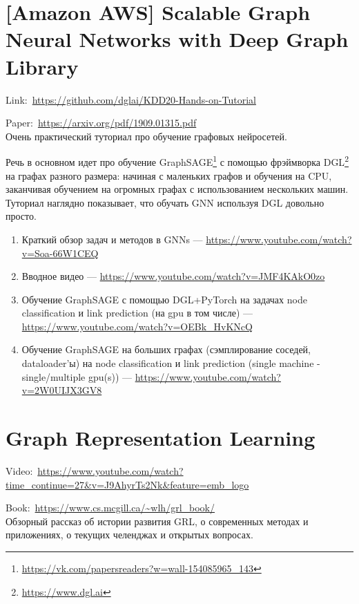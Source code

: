\section*{[Amazon AWS] Scalable Graph Neural Networks with Deep Graph Library} 

Link:~\url{https://github.com/dglai/KDD20-Hands-on-Tutorial}

Paper:~\url{https://arxiv.org/pdf/1909.01315.pdf} \\

Очень практический туториал про обучение графовых нейросетей. 

Речь в основном идет про обучение GraphSAGE\footnote{\url{https://vk.com/papersreaders?w=wall-154085965_143}} с помощью фрэймворка DGL\footnote{\url{https://www.dgl.ai}} на графах разного размера: начиная с маленьких графов и обучения на CPU, заканчивая обучением на огромных графах с использованием нескольких машин. \\

Туториал наглядно показывает, что обучать GNN используя DGL довольно просто.

\begin{enumerate}
    \item Краткий обзор задач и методов в GNNs --- \url{https://www.youtube.com/watch?v=Soa-66W1CEQ}
    \item Вводное видео --- \url{https://www.youtube.com/watch?v=JMF4KAkO0zo}
    \item Обучение GraphSAGE с помощью DGL+PyTorch на задачах node classification и link prediction (на gpu в том числе) --- \url{https://www.youtube.com/watch?v=OEBk_HvKNcQ}
    \item Обучение GraphSAGE на больших графах (сэмплирование соседей, dataloader'ы) на node classification и link prediction (single machine - single/multiple gpu(s)) --- \url{https://www.youtube.com/watch?v=2W0UIJX3GV8}
\end{enumerate}

\section*{Graph Representation Learning}

Video:~\url{https://www.youtube.com/watch?time_continue=27&v=J9AhyrTs2Nk&feature=emb_logo}

Book:~\url{https://www.cs.mcgill.ca/~wlh/grl_book/} \\

Обзорный рассказ об истории развития GRL, о современных методах и приложениях, о текущих челенджах и открытых вопросах.

